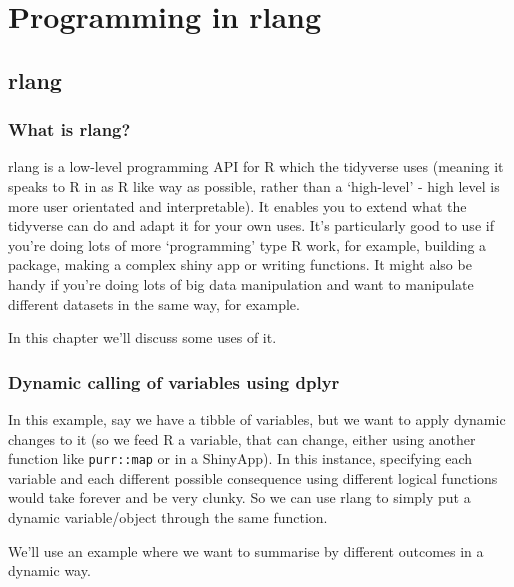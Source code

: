\documentclass[]{book}
\begin{document}
\hypertarget{programming-in-rlang}{%
\chapter{Programming in rlang}\label{programming-in-rlang}}

\hypertarget{rlang}{%
\section{rlang}\label{rlang}}

\hypertarget{what-is-rlang}{%
\subsection{What is rlang?}\label{what-is-rlang}}

rlang is a low-level programming API for R which the tidyverse uses (meaning it speaks to R in as R like way as possible, rather than a `high-level' - high level is more user orientated and interpretable). It enables you to extend what the tidyverse can do and adapt it for your own uses. It's particularly good to use if you're doing lots of more `programming' type R work, for example, building a package, making a complex shiny app or writing functions. It might also be handy if you're doing lots of big data manipulation and want to manipulate different datasets in the same way, for example.

In this chapter we'll discuss some uses of it.

\hypertarget{dynamic-calling-of-variables-using-dplyr}{%
\subsection{Dynamic calling of variables using dplyr}\label{dynamic-calling-of-variables-using-dplyr}}

In this example, say we have a tibble of variables, but we want to apply dynamic changes to it (so we feed R a variable, that can change, either using another function like \texttt{purr::map} or in a ShinyApp). In this instance, specifying each variable and each different possible consequence using different logical functions would take forever and be very clunky. So we can use rlang to simply put a dynamic variable/object through the same function.

We'll use an example where we want to summarise by different outcomes in a dynamic way.
\end{document}
